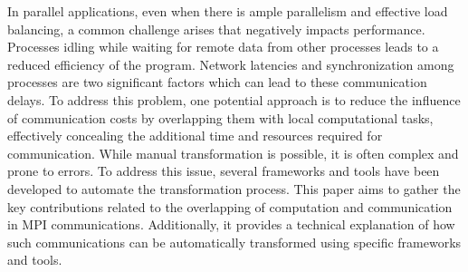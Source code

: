 \noindent
In parallel applications, even when there is ample parallelism and effective load balancing, a common challenge arises that negatively impacts performance. Processes idling while waiting for remote data from other processes leads to a reduced efficiency of the program. Network latencies and synchronization among processes are two significant factors which can lead to these communication delays. To address this problem, one potential approach is to reduce the influence of communication costs by overlapping them with local computational tasks, effectively concealing the additional time and resources required for communication.
While manual transformation is possible, it is often complex and prone to errors. To address this issue, several frameworks and tools have been developed to automate the transformation process. This paper aims to gather the key contributions related to the overlapping of computation and communication in MPI communications. Additionally, it provides a technical explanation of how such communications can be automatically transformed using specific frameworks and tools.
